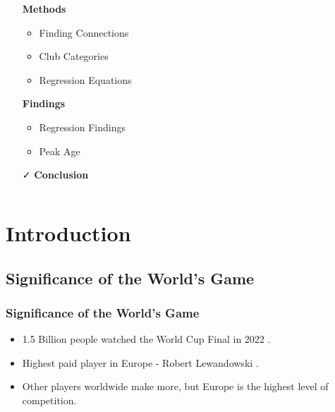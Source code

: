 \documentclass[t,aspectratio=169,xcolor=dvipsnames]{beamer}
\begin{document}
\begin{frame}[plain]
\begin{columns}[T]
        \begin{column}{0.48\textwidth}
            \begin{itemize}
                \item[\faLineChart] \textbf{Methods}
                \begin{itemize}
                    \item Finding Connections
                    \item Club Categories
                    \item Regression Equations
                \end{itemize}
                \item[\faSearch] \textbf{Findings}
                \begin{itemize}
                    \item Regression Findings
                    \item Peak Age
                \end{itemize}
                \item[\faCheck] \textbf{Conclusion}
            \end{itemize}
        \end{column}
    \end{columns}
\end{frame}
\section{Introduction}

\subsection{Significance of the World's Game}
\begin{frame}
    \frametitle{Significance of the World's Game}
    \vspace{0.5cm} %
    \begin{itemize}
        \item 1.5 Billion people watched the World Cup Final in 2022 \citep{Worldcupratings}. 
        \item Highest paid player in Europe - Robert Lewandowski \citep{Lewandowski}.
        \item Other players worldwide make more, but Europe is the highest level of competition. 
    \end{itemize}
\end{frame}
\end{document}
